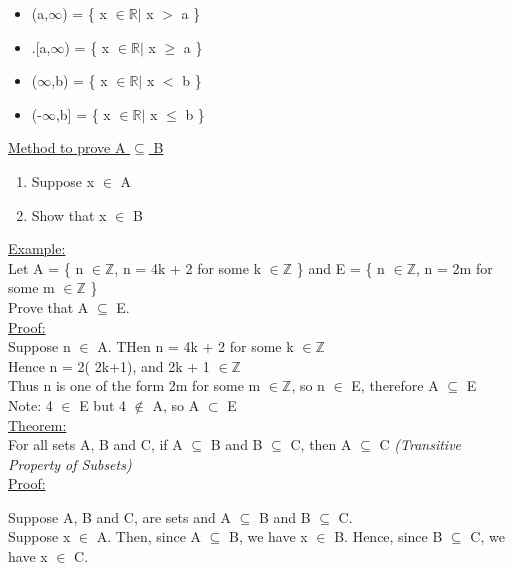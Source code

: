 \documentclass{article}
\begin{document}
\begin{itemize}
\item (a,$\infty$) = \{ x $\in \mathbb{R} |$ x $>$ a \}
\item .[a,$\infty$) = \{ x $\in \mathbb{R} |$ x $\geq$ a \}
\item ($\infty$,b) = \{ x $\in \mathbb{R} |$ x $<$ b \}
\item (-$\infty$,b] = \{ x $\in \mathbb{R} |$ x $\leq$ b \}
\end{itemize}

\underline{Method to prove A $\subseteq$ B}

\begin{enumerate}
\item Suppose x $\in$ A
\item Show that x $\in$ B
\end{enumerate}

\underline{Example:}\\
Let A = \{ n $\in \mathbb{Z}$, n = 4k + 2 for some k $\in \mathbb{Z}$ \} and  E = \{ n $\in \mathbb{Z}$, n = 2m for some m $\in \mathbb{Z}$ \} \\

Prove that A $\subseteq$ E. \\

\underline{Proof:} \\
Suppose n $\in$ A. THen n = 4k + 2 for some k $\in \mathbb{Z}$ \\

Hence n = 2( 2k+1), and 2k + 1 $\in \mathbb{Z}$ \\

Thus n is one of the form 2m for some m $\in \mathbb{Z}$, so n $\in$ E, therefore A $\subseteq$ E \\

Note: 4 $\in$ E but 4 $\notin$ A, so A $\subset$ E \\

\underline{Theorem:} \\

For all sets A, B and C, if A $\subseteq$ B and B $\subseteq$ C, then A $\subseteq$ C
\textit{(Transitive Property of Subsets)} \\

\underline{Proof:}

Suppose A, B and C, are sets and A $\subseteq$ B and B $\subseteq$ C.\\

Suppose x $\in$ A. Then, since A $\subseteq$ B, we have x $\in$ B. Hence, since B $\subseteq$ C, we have x $\in$ C. \\
\end{document}
